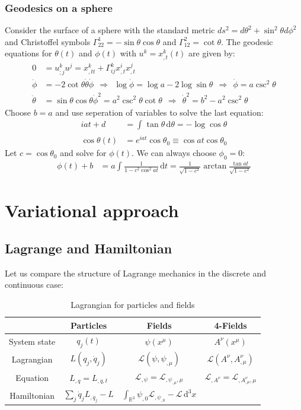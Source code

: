 \documentclass[a4paper,12pt]{article}
\newcommand{\intx}{}
\newcommand{\intr}{}
\begin{document}
\subsubsection{Geodesics on a sphere}
Consider the surface of a sphere with the standard metric $ds^2=d\theta^2+\sin^2\theta d\phi^2$ and Christoffel symbols $\Gamma^1_{22}=-\sin\theta\cos\theta$ and $\Gamma^2_{12}=\cot\theta$. The geodesic equations for $\theta(t)$ and $\phi(t)$ with $u^k=x^k_{,t}(t)$ are given by:
\begin{align*}
0&=u^k_{;j}u^j=x^k_{,tt}+\Gamma^k_{ij}x^i_{,t}x^j_{,t}\\
\ddot{\phi}&=-2\cot\theta\dot{\theta}\dot{\phi}\ \ \Rightarrow\ \ \log\dot{\phi}=\log a-2\log\sin\theta\ \ \Rightarrow\ \ \dot{\phi}=a\csc^2\theta\\
\ddot{\theta}&=\sin\theta\cos\theta\dot{\phi}^2=a^2\csc^2\theta\cot\theta\ \ \Rightarrow\ \ \dot{\theta}^2=b^2-a^2\csc^2\theta
\end{align*}
Choose $b=a$ and use seperation of variables to solve the last equation:
\begin{align*}
iat+d&=\intx\int_{ }^{ }\tan\theta\,\mathrm{d}\theta=-\log\cos\theta\\
\cos\theta(t)&=e^{iat}\cos\theta_0\equiv\cos at\cos\theta_0
\end{align*}
Let $c=\cos\theta_0$ and solve for $\phi(t)$. We can always choose $\phi_0=0$:
\begin{align*}
\phi(t)+b&=a\intx\int_{ }^{ }\frac{1}{1-c^2\cos^2at}\,\mathrm{d}t=\frac{1}{\sqrt{1-c^2}}\arctan\frac{\tan at}{\sqrt{1-c^2}}
\end{align*}
\section{Variational approach}
\subsection{Lagrange and Hamiltonian}
Let us compare the structure of Lagrange mechanics in the discrete and continuous case:
\begin{table}[h!]
\centering
\begin{tabular}{c|c|c|c}
&Particles&Fields&4-Fields\\ \hline
System state&$q_j(t)$&$\psi(x^\mu)$&$A^\nu(x^\mu)$\\ \hline
Lagrangian&$L(q_j,\dot{q}_j)$&$\mathcal{L}(\psi,\psi_{,\mu})$&$\mathcal{L}(A^\nu,A^\nu_{,\mu})$\\ \hline
Equation&$L_{,q}=L_{,\dot{q},t}$&$\mathcal{L}_{,\psi}=\mathcal{L}_{,\psi_{,\mu},\mu}$&$\mathcal{L}_{,A^\nu}=\mathcal{L}_{,A^\nu_{,\mu},\mu}$\\ \hline
Hamiltonian&$\sum_j\dot{q}_jL_{,\dot{q_j}}-L$&$\intr\int_{\mathbb{R}^{3}}{\psi_{,0}\mathcal{L}_{,\psi_{,0}}-\mathcal{L}}\,\mathrm{d}^{3}x$&
\end{tabular}
\caption{Lagrangian for particles and fields}
\label{Lagrangian for particles and fields}
\end{table}
\end{document}
